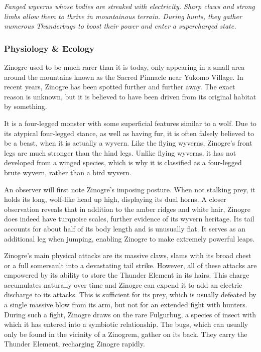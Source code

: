\textit{Fanged wyverns whose bodies are streaked with electricity. Sharp claws and strong limbs allow them to thrive in mountainous terrain. During hunts, they gather numerous Thunderbugs to boost their power and enter a supercharged state.}

\subsubsection{Physiology \& Ecology}
Zinogre used to be much rarer than it is today, only appearing in a small area around the mountains known as the Sacred Pinnacle near Yukomo Village. In recent years, Zinogre has been spotted further and further away. The exact reason is unknown, but it is believed to have been driven from its original habitat by something.

It is a four-legged monster with some superficial features similar to a wolf. Due to its atypical four-legged stance, as well as having fur, it is often falsely believed to be a beast, when it is actually a wyvern. Like the flying wyverns, Zinogre's front legs are much stronger than the hind legs. Unlike flying wyverns, it has not developed from a winged species, which is why it is classified as a four-legged brute wyvern, rather than a bird wyvern.

An observer will first note Zinogre's imposing posture. When not stalking prey, it holds its long, wolf-like head up high, displaying its dual horns. A closer observation reveals that  in addition to the amber ridges and white hair, Zinogre does indeed have turquoise scales, further evidence of its wyvern heritage. Its tail accounts for about half of its body length and is unusually flat. It serves as an additional leg when jumping, enabling Zinogre to make extremely powerful leaps.

Zinogre's main physical attacks are its massive claws, slams with its broad chest or a full somersault into a devastating tail strike. However, all of these attacks are empowered by its ability to store the Thunder Element in its hairs. This charge accumulates naturally over time and Zinogre can expend it to add an electric discharge to its attacks. This is sufficient for its prey, which is usually defeated by a single massive blow from its arm, but not for an extended fight with hunters. During such a fight, Zinogre draws on the rare Fulgurbug, a species of insect with which it has entered into a symbiotic relationship. The bugs, which can usually only be found in the vicinity of a Zinogrem, gather on its back. They carry the Thunder Element, recharging Zinogre rapidly.

